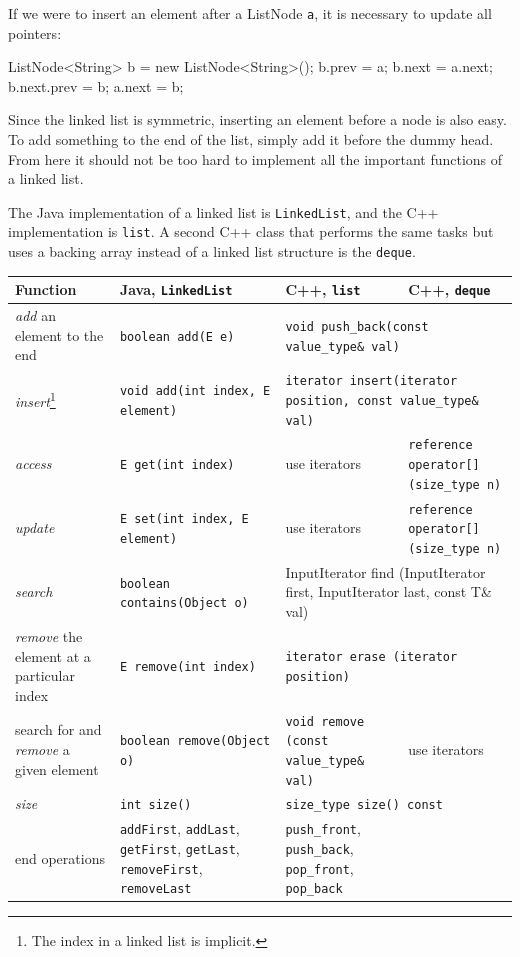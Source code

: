 If we were to insert an element after a ListNode \texttt{a}, it is necessary to update all pointers:

\begin{mylstlisting}
ListNode<String> b = new ListNode<String>();
b.prev = a;
b.next = a.next;
b.next.prev = b;
a.next = b;
\end{mylstlisting}

Since the linked list is symmetric, inserting an element before a node is also easy. To add something to the end of the list, simply add it before the dummy head. From here it should not be too hard to implement all the important functions of a linked list.

The Java implementation of a linked list is \texttt{LinkedList}, and the C++ implementation is \texttt{list}. A second C++ class that performs the same tasks but uses a backing array instead of a linked list structure is the \texttt{deque}.

\begin{center}
    \begin{tabular}{ p{3cm} p{4cm} p{4cm} p{4cm} }
	Function	&	Java, \texttt{LinkedList}	&	C++, \texttt{list} & C++, \texttt{deque} \\
	\hline
\textit{add} an element to the end & \texttt{boolean add(E e)} & \multicolumn{2}{p{8cm}}{\centering \texttt{void push\_back(const value\_type\& val)}} \\
\textit{insert}\footnote{The index in a linked list is implicit.} & \texttt{void add(int index, E element)} & \multicolumn{2}{p{8cm}}{\centering \texttt{iterator insert(iterator position, const value\_type\& val)}} \\
\textit{access} & \texttt{E get(int index)} & use iterators & \texttt{reference operator[] (size\_type n)} \\
\textit{update} & \texttt{E set(int index, E element)} & use iterators & \texttt{reference operator[] (size\_type n)} \\
\textit{search} & \texttt{boolean contains(Object o)} & \multicolumn{2}{p{8cm}}{\centering InputIterator find (InputIterator first, InputIterator last, const T\& val)}\footnote{This function is in \texttt{<algorithm>}.} \\
\textit{remove} the element at a particular index & \texttt{E remove(int index)} & \multicolumn{2}{p{8cm}}{\centering \texttt{iterator erase (iterator position)}} \\
search for and \textit{remove} a given element & \texttt{boolean remove(Object o)} & \texttt{void remove (const value\_type\& val)} & use iterators \\
\textit{size} & \texttt{int size()} & \multicolumn{2}{p{8cm}}{\centering \texttt{size\_type size() const}} \\
end operations & \texttt{addFirst}, \texttt{addLast}, \texttt{getFirst}, \texttt{getLast}, \texttt{removeFirst}, \texttt{removeLast} & \texttt{push\_front}, \texttt{push\_back}, \texttt{pop\_front}, \texttt{pop\_back}
    \end{tabular}
\end{center}

